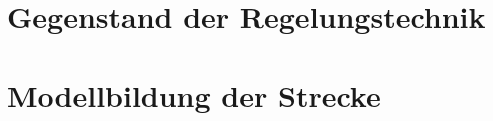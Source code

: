 \documentclass{LxUm}
\begin{document}
 
\singlespacing

\pagestyle{fancy}

\sffamily



\chapter{Gegenstand der Regelungstechnik} 
\chapter{Modellbildung der Strecke} 

\end{document}
